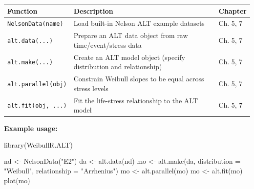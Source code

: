 \documentclass[
  letterpaper,
  DIV=11,
  numbers=noendperiod]{scrreprt}
\newenvironment{Shaded}{\begin{snugshade}}{\end{snugshade}}
\newcommand{\AttributeTok}[1]{\textcolor[rgb]{0.40,0.45,0.13}{#1}}
\newcommand{\FunctionTok}[1]{\textcolor[rgb]{0.28,0.35,0.67}{#1}}
\newcommand{\NormalTok}[1]{\textcolor[rgb]{0.00,0.23,0.31}{#1}}
\newcommand{\OtherTok}[1]{\textcolor[rgb]{0.00,0.23,0.31}{#1}}
\newcommand{\StringTok}[1]{\textcolor[rgb]{0.13,0.47,0.30}{#1}}
\newcounter{none} %
\begin{document}
{\def\LTcaptype{none} %
\begin{longtable}[]{@{}
  >{\raggedright\arraybackslash}p{}
  >{\raggedright\arraybackslash}p{}
  >{\raggedright\arraybackslash}p{}@{}}
\toprule\noalign{}
\begin{minipage}[b]{\linewidth}\raggedright
Function
\end{minipage} & \begin{minipage}[b]{\linewidth}\raggedright
Description
\end{minipage} & \begin{minipage}[b]{\linewidth}\raggedright
Chapter
\end{minipage} \\
\midrule\noalign{}
\endhead
\bottomrule\noalign{}
\endlastfoot
\texttt{NelsonData(name)} & Load built-in Nelson ALT example datasets &
Ch. 5, 7 \\
\texttt{alt.data(...)} & Prepare an ALT data object from raw
time/event/stress data & Ch. 5, 7 \\
\texttt{alt.make(...)} & Create an ALT model object (specify
distribution and relationship) & Ch. 5, 7 \\
\texttt{alt.parallel(obj)} & Constrain Weibull slopes to be equal across
stress levels & Ch. 5, 7 \\
\texttt{alt.fit(obj,\ ...)} & Fit the life-stress relationship to the
ALT model & Ch. 5, 7 \\
\end{longtable}
}

\textbf{Example usage:}

\begin{Shaded}
\begin{Highlighting}[]
\FunctionTok{library}\NormalTok{(WeibullR.ALT)}

\NormalTok{nd }\OtherTok{\textless{}{-}} \FunctionTok{NelsonData}\NormalTok{(}\StringTok{"E2"}\NormalTok{)}
\NormalTok{da }\OtherTok{\textless{}{-}} \FunctionTok{alt.data}\NormalTok{(nd)}
\NormalTok{mo }\OtherTok{\textless{}{-}} \FunctionTok{alt.make}\NormalTok{(da, }\AttributeTok{distribution =} \StringTok{"Weibull"}\NormalTok{, }\AttributeTok{relationship =} \StringTok{"Arrhenius"}\NormalTok{)}
\NormalTok{mo }\OtherTok{\textless{}{-}} \FunctionTok{alt.parallel}\NormalTok{(mo)}
\NormalTok{mo }\OtherTok{\textless{}{-}} \FunctionTok{alt.fit}\NormalTok{(mo)}
\FunctionTok{plot}\NormalTok{(mo)}
\end{Highlighting}
\end{Shaded}
\end{document}
